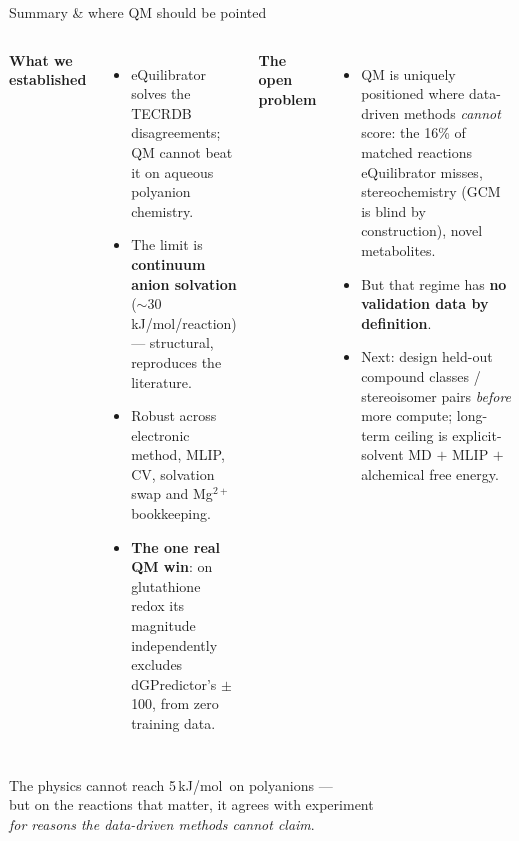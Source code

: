 \documentclass[aspectratio=169,11pt]{beamer}
\newcommand{\kj}{\,kJ/mol}
\newcommand{\win}[1]{\textcolor{good}{\textbf{#1}}}
\begin{document}
\begin{frame}{Summary \& where QM should be pointed}
  \begin{columns}[T]
      \textbf{What we established}
      \begin{itemize}
        \item eQuilibrator solves the TECRDB disagreements; QM cannot beat it on
              aqueous polyanion chemistry.
        \item The limit is \textbf{continuum anion solvation}
              ($\sim$30\kj/reaction) — structural, reproduces the literature.
        \item Robust across electronic method, MLIP, CV, solvation swap and
              Mg$^{2+}$ bookkeeping.
        \item \win{The one real QM win}: on glutathione redox its magnitude
              independently excludes dGPredictor's $\pm$100, from zero training data.
      \end{itemize}
      \textbf{The open problem}
      \begin{itemize}
        \item QM is uniquely positioned where data-driven methods \emph{cannot}
              score: the 16\% of matched reactions eQuilibrator misses,
              stereochemistry (GCM is blind by construction), novel metabolites.
        \item But that regime has \textbf{no validation data by definition}.
        \item Next: design held-out compound classes / stereoisomer pairs
              \emph{before} more compute; long-term ceiling is explicit-solvent
              MD $+$ MLIP $+$ alchemical free energy.
      \end{itemize}
  \end{columns}
\end{frame}

\begin{frame}[standout]
  The physics cannot reach 5\kj\ on polyanions —\\
  but on the reactions that matter, it agrees with experiment\\
  \emph{for reasons the data-driven methods cannot claim}.
\end{frame}
\end{document}
